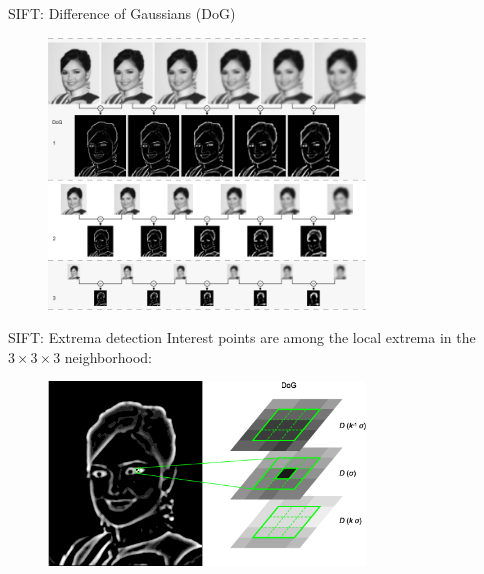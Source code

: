 \documentclass{beamer}
\newcommand{\1}[1]{\mathbbm{1}\left[#1\right]}
\begin{document}
\begin{frame}{SIFT: Difference of Gaussians (DoG)}

\begin{figure}
\centering
\includegraphics[width=0.75\textwidth]{images/dog.png}
\end{figure}
\end{frame}

\begin{frame}{SIFT: Extrema detection}
Interest points are among the local extrema in the $3\times3\times3$ neighborhood:
\begin{figure}
\centering
\includegraphics[width=0.75\textwidth]{images/sift_extrema.png}
\end{figure}
\end{frame}
\end{document}
